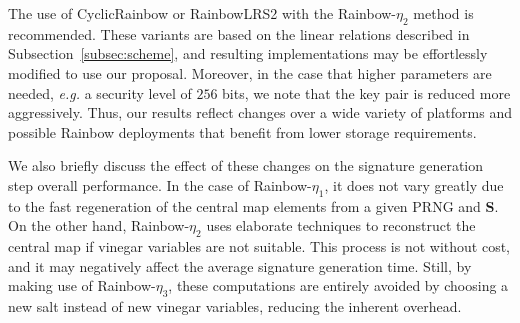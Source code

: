 \documentclass[draft, 12pt, a4paper, oneside]{memoir}
\theoremstyle{definition}
\theoremstyle{remark}
\begin{document}
The use of CyclicRainbow or RainbowLRS2 with the Rainbow-$\eta_{2}$ method is
recommended. These variants are based on the linear relations described in
Subsection~\ref{subsec:scheme}, and resulting implementations may be
effortlessly modified to use our proposal. Moreover, in the case that higher
parameters are needed, \emph{e.g.} a security level of $256$ bits, we note that
the key pair is reduced more aggressively. Thus, our results reflect
changes over a wide variety of platforms and possible Rainbow deployments that
benefit from lower storage requirements.

We also briefly discuss the effect of these changes on the signature generation
step overall performance. In the case of Rainbow-$\eta_{1}$, it does not vary
greatly due to the fast regeneration of the central map elements from a given
PRNG and $\mathbf{S}$. On the other hand, Rainbow-$\eta_{2}$ uses elaborate
techniques to reconstruct the central map if vinegar variables are not
suitable.  This process is not without cost, and it may negatively affect the
average signature generation time. Still, by making use of Rainbow-$\eta_{3}$,
these computations are entirely avoided by choosing a new salt instead of new
vinegar variables, reducing the inherent overhead.



\end{document}
